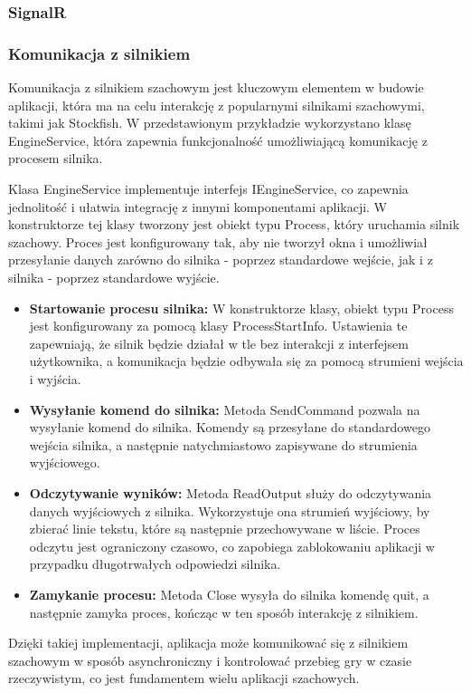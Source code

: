 \documentclass[12pt,a4paper]{article}
\begin{document}
\newpage
\subsubsection{SignalR}

\newpage
\subsubsection{Komunikacja z silnikiem}
Komunikacja z silnikiem szachowym jest kluczowym elementem w budowie aplikacji, która ma na celu interakcję z popularnymi silnikami szachowymi, takimi jak Stockfish. W przedstawionym przykładzie wykorzystano klasę EngineService, która zapewnia funkcjonalność umożliwiającą komunikację z procesem silnika.

Klasa EngineService implementuje interfejs IEngineService, co zapewnia jednolitość i ułatwia integrację z innymi komponentami aplikacji. W konstruktorze tej klasy tworzony jest obiekt typu Process, który uruchamia silnik szachowy. Proces jest konfigurowany tak, aby nie tworzył okna i umożliwiał przesyłanie danych zarówno do silnika - poprzez standardowe wejście, jak i z silnika - poprzez standardowe wyjście.

\begin{itemize} 
    \item \textbf{Startowanie procesu silnika:} W konstruktorze klasy, obiekt typu Process jest konfigurowany za pomocą klasy ProcessStartInfo. Ustawienia te zapewniają, że silnik będzie działał w tle bez interakcji z interfejsem użytkownika, a komunikacja będzie odbywała się za pomocą strumieni wejścia i wyjścia. 
    \item \textbf{Wysyłanie komend do silnika:} Metoda SendCommand pozwala na wysyłanie komend do silnika. Komendy są przesyłane do standardowego wejścia silnika, a następnie natychmiastowo zapisywane do strumienia wyjściowego. 
    \item \textbf{Odczytywanie wyników:} Metoda ReadOutput służy do odczytywania danych wyjściowych z silnika. Wykorzystuje ona strumień wyjściowy, by zbierać linie tekstu, które są następnie przechowywane w liście. Proces odczytu jest ograniczony czasowo, co zapobiega zablokowaniu aplikacji w przypadku długotrwałych odpowiedzi silnika. 
    \item \textbf{Zamykanie procesu:} Metoda Close wysyła do silnika komendę quit, a następnie zamyka proces, kończąc w ten sposób interakcję z silnikiem. 
\end{itemize}

Dzięki takiej implementacji, aplikacja może komunikować się z silnikiem szachowym w sposób asynchroniczny i kontrolować przebieg gry w czasie rzeczywistym, co jest fundamentem wielu aplikacji szachowych.
\end{document}
